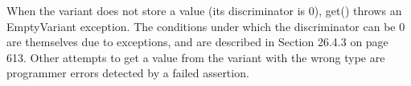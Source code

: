 When the variant does not store a value (its discriminator is 0), get() throws an EmptyVariant exception. The conditions under which the discriminator can be 0 are themselves due to exceptions, and are described in Section 26.4.3 on page 613. Other attempts to get a value from the variant with the wrong type are programmer errors detected by a failed assertion.













































